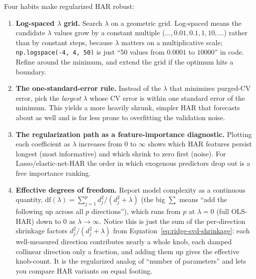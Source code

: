 \begin{keyidea}
Four habits make regularized HAR robust:
\begin{enumerate}[nosep]
  \item \textbf{Log-spaced $\lambda$ grid.} Search $\lambda$ on a geometric grid. Log-spaced means the candidate $\lambda$ values grow by a constant multiple ($\ldots, 0.01, 0.1, 1, 10, \ldots$) rather than by constant steps, because $\lambda$ matters on a multiplicative scale; \texttt{np.logspace(-4, 4, 50)} is just ``50 values from $0.0001$ to $10000$'' in code. Refine around the minimum, and extend the grid if the optimum hits a boundary.
  \item \textbf{The one-standard-error rule.} Instead of the $\lambda$ that minimizes purged-CV error, pick the \emph{largest} $\lambda$ whose CV error is within one standard error of the minimum. This yields a more heavily shrunk, simpler HAR that forecasts about as well and is far less prone to overfitting the validation noise.
  \item \textbf{The regularization path as a feature-importance diagnostic.} Plotting each coefficient as $\lambda$ increases from $0$ to $\infty$ shows which HAR features persist longest (most informative) and which shrink to zero first (noise). For Lasso/elastic-net-HAR the order in which exogenous predictors drop out is a free importance ranking.
  \item \textbf{Effective degrees of freedom.} Report model complexity as a continuous quantity, $\mathrm{df}(\lambda) = \sum_{j=1}^{p} d_j^2/(d_j^2 + \lambda)$ (the big $\sum$ means ``add the following up across all $p$ directions''), which runs from $p$ at $\lambda = 0$ (full OLS-HAR) down to $0$ as $\lambda \to \infty$. Notice this is just the sum of the per-direction shrinkage factors $d_j^2/(d_j^2+\lambda)$ from Equation~\eqref{eq:ridge-svd-shrinkage}: each well-measured direction contributes nearly a whole knob, each damped collinear direction only a fraction, and adding them up gives the effective knob-count. It is the regularized analog of ``number of parameters'' and lets you compare HAR variants on equal footing.
\end{enumerate}
\end{keyidea}

